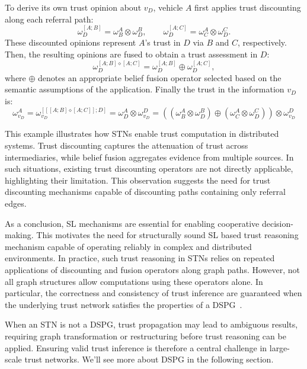 To derive its own trust opinion about $v_D$, vehicle $A$ first applies trust discounting along each referral path:
\[
\omega^{[A;B]}_{D} = \omega^A_B \otimes\omega^B_{D}, \qquad
\omega^{[A;C]}_{D} = \omega^A_C \otimes\omega^C_{D}.
\]
These discounted opinions represent $A$’s trust in \(D\) via $B$ and $C$, respectively. Then, the resulting opinions are fused to obtain a trust assessment in \(D\):
\[
\omega^{[A;B] \diamond [A;C]}_{D} = \omega^{[A;B]}_{D} \oplus \omega^{[A;C]}_{D},
\]
where $\oplus$ denotes an appropriate belief fusion operator selected based on the semantic assumptions of the application. Finally the trust in the information \(v_D\) is:
\[
\omega^{A}_{v_D} = \omega_{v_D}^{\left[ \left[\left[A;B\right] \diamond \left[A;C\right]\right];D \right]} = \omega^A_{D} \otimes \omega^D_{v_D} = \left( \left( \omega^A_B \otimes\omega^B_{D} \right) \oplus \left( \omega^A_C \otimes\omega^C_{D} \right)  \right) \otimes \omega^D_{v_D}
\]



This example illustrates how \acp{STN} enable trust computation in distributed systems. Trust discounting captures the attenuation of trust across intermediaries, while belief fusion aggregates evidence from multiple sources. In such situations, existing trust discounting operators are not directly applicable, highlighting their limitation. This observation suggests the need for trust discounting mechanisms capable of discounting paths containing only referral edges.

As a conclusion, \ac{SL} mechanisms are essential for enabling cooperative decision-making. This motivates the need for structurally sound \ac{SL} based trust reasoning mechanism  capable of operating reliably in complex and distributed environments. In practice, such trust reasoning in \acp{STN} relies on repeated applications of discounting and fusion operators along graph paths. However, not all graph structures allow computations using these operators alone. In particular, the correctness and consistency of trust inference are guaranteed when the underlying trust network satisfies the properties of a \acf{DSPG}~\cite{josang2016subjective}.

When an \ac{STN} is not a \ac{DSPG}, trust propagation may lead to ambiguous results, requiring graph transformation or restructuring before trust reasoning can be applied. Ensuring valid trust inference is therefore a central challenge in large-scale trust networks. We'll see more about \ac{DSPG} in the following section.


